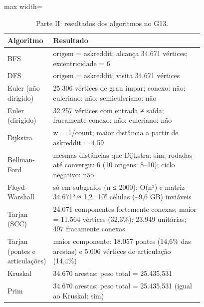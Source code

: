 \begin{table}[t]
\centering
\small
\caption{Parte II: resultados dos algoritmos no G13.}
\label{tab:algoritmos}
\begin{adjustbox}{max width=\linewidth}
\begin{tabular}{lp{0.78\linewidth}}
\toprule
Algoritmo & Resultado \\
\midrule
BFS & origem = askreddit; alcança 34.671 vértices; excentricidade = 6 \\
DFS & origem = askreddit; visita 34.671 vértices \\
Euler (não dirigido) & 25.306 vértices de grau ímpar; conexo: não; euleriano: não; semieuleriano: não \\
Euler (dirigido) & 32.257 vértices com entrada ≠ saída; fracamente conexo: não; euleriano: não \\
Dijkstra & w = 1/count; maior distância a partir de askreddit = 4,59 \\
Bellman-Ford & mesmas distâncias que Dijkstra: sim; rodadas até convergir: 6 (10 origens: 8–10); ciclo negativo: não \\
Floyd-Warshall & só em subgrafos (n ≤ 2000): O(n³) e matriz 34.671² ≈ 1,2·10⁹ células (\textasciitilde{}9,6 GB) inviáveis \\
Tarjan (SCC) & 24.071 componentes fortemente conexas; maior = 11.564 vértices (32,3\%); 23.949 unitárias; 497 fracamente conexas \\
Tarjan (pontes e articulações) & maior componente: 18.057 pontes (14,6\% das arestas) e 5.006 vértices de articulação (14,4\%) \\
Kruskal & 34.670 arestas; peso total = 25.435,531 \\
Prim & 34.670 arestas; peso total = 25.435,531 (igual ao Kruskal: sim) \\
\bottomrule
\end{tabular}
\end{adjustbox}
\end{table}
